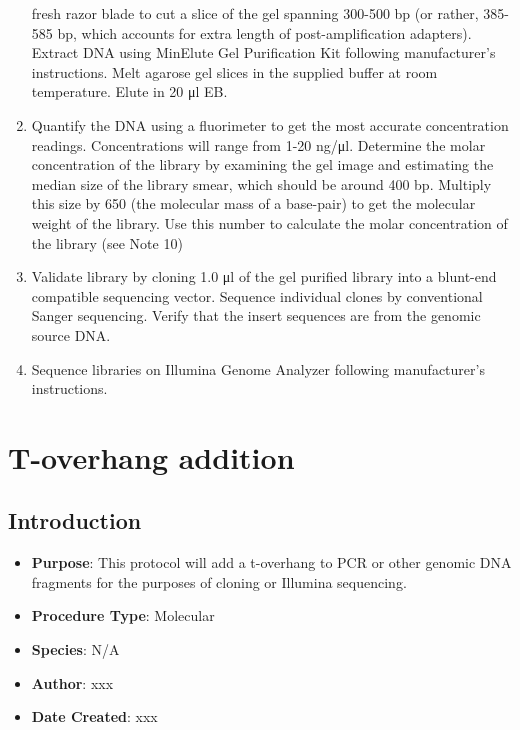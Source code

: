 \documentclass[
  letterpaper,
  DIV=11,
  numbers=noendperiod]{scrreprt}
\providecommand{\tightlist}{%
  \setlength{\itemsep}{0pt}\setlength{\parskip}{0pt}}\usepackage{longtable,booktabs,array}
\begin{document}
\begin{enumerate}
  fresh razor blade to cut a slice of the gel spanning 300-500 bp (or
  rather, 385-585 bp, which accounts for extra length of
  post-amplification adapters). Extract DNA using MinElute Gel
  Purification Kit following manufacturer's instructions. Melt agarose
  gel slices in the supplied buffer at room temperature. Elute in 20 μl
  EB.
\item
  Quantify the DNA using a fluorimeter to get the most accurate
  concentration readings. Concentrations will range from 1-20 ng/μl.
  Determine the molar concentration of the library by examining the gel
  image and estimating the median size of the library smear, which
  should be around 400 bp. Multiply this size by 650 (the molecular mass
  of a base-pair) to get the molecular weight of the library. Use this
  number to calculate the molar concentration of the library (see Note
  10)
\item
  Validate library by cloning 1.0 μl of the gel purified library into a
  blunt-end compatible sequencing vector. Sequence individual clones by
  conventional Sanger sequencing. Verify that the insert sequences are
  from the genomic source DNA.
\item
  Sequence libraries on Illumina Genome Analyzer following
  manufacturer's instructions.
\end{enumerate}

\hypertarget{sec-molecular-T_overhang}{%
\chapter{T-overhang addition}\label{sec-molecular-T_overhang}}

\hypertarget{introduction-24}{%
\section{Introduction}\label{introduction-24}}

\begin{itemize}
\tightlist
\item
  \textbf{Purpose}: This protocol will add a t-overhang to PCR or other
  genomic DNA fragments for the purposes of cloning or Illumina
  sequencing.
\item
  \textbf{Procedure Type}: Molecular
\item
  \textbf{Species}: N/A
\item
  \textbf{Author}: xxx
\item
  \textbf{Date Created}: xxx
\end{itemize}
\end{document}
